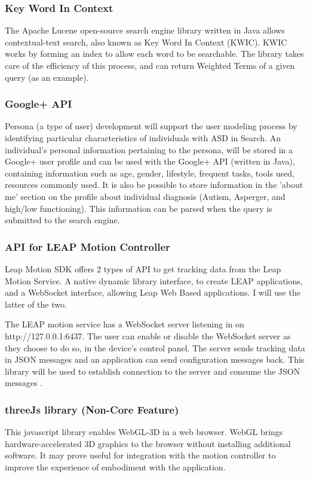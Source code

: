 \documentclass[10pt]{article}
\begin{document}
\subsubsection{Key Word In Context} \label{KWIC} 
The Apache Lucene open-source search engine library written in Java allows contextual-text search, also known as Key Word In Context (KWIC)\cite{kwic}. KWIC works by forming an index to allow each word to be searchable. The library takes care of the efficiency of this process, and can return Weighted Terms of a given query (as an example).


\subsubsection{Google+ API}
Persona (a type of user) development will support the user modeling process by identifying particular characteristics of individuals with ASD in Search. An individual’s personal information pertaining to the persona, will be stored in a Google+ user profile and can be used with the Google+ API (written in Java), containing information such as age, gender, lifestyle, frequent tasks, tools used, resources commonly used. It is also be possible to store information in the 'about me' section on the profile about individual diagnosis (Autism, Asperger, and high/low functioning). This information can be parsed when the query is submitted to the search engine.

\subsubsection{API for LEAP Motion Controller}
Leap Motion SDK offers 2 types of API to get tracking data from the Leap Motion Service. A native dynamic library interface, to create LEAP applications, and a WebSocket interface, allowing Leap Web Based applications. I will use the latter of the two.

The LEAP motion service has a WebSocket server listening in on http://127.0.0.1:6437. The user can enable or disable the WebSocket server as they choose to do so, in the device's control panel.
The server sends tracking data in JSON messages and an application can send configuration messages back. This library will be used to establish connection to the server and consume the JSON messages \cite{leap}. 


\subsubsection{threeJs library (Non-Core Feature)}
This javascript library enables WebGL-3D in a web browser. WebGL brings hardware-accelerated 3D graphics to the browser without installing additional software. It may prove useful for integration with the motion controller to improve the experience of embodiment with the application.
\end{document}
